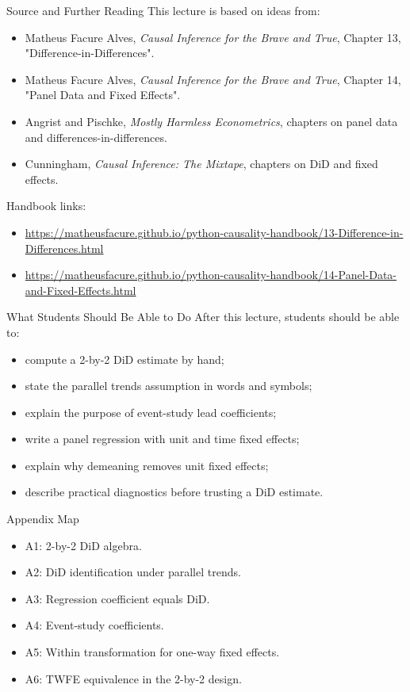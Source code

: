 \documentclass[11pt,aspectratio=169]{beamer}
\begin{document}
\begin{frame}{Source and Further Reading}
  This lecture is based on ideas from:
  \begin{itemize}
    \item Matheus Facure Alves, \emph{Causal Inference for the Brave and True}, Chapter 13, "Difference-in-Differences".
    \item Matheus Facure Alves, \emph{Causal Inference for the Brave and True}, Chapter 14, "Panel Data and Fixed Effects".
    \item Angrist and Pischke, \emph{Mostly Harmless Econometrics}, chapters on panel data and differences-in-differences.
    \item Cunningham, \emph{Causal Inference: The Mixtape}, chapters on DiD and fixed effects.
  \end{itemize}
  \vspace{0.3em}
  Handbook links:
  \begin{itemize}
    \item \url{https://matheusfacure.github.io/python-causality-handbook/13-Difference-in-Differences.html}
    \item \url{https://matheusfacure.github.io/python-causality-handbook/14-Panel-Data-and-Fixed-Effects.html}
  \end{itemize}
\end{frame}

\begin{frame}{What Students Should Be Able to Do}
  After this lecture, students should be able to:
  \begin{itemize}
    \item compute a 2-by-2 DiD estimate by hand;
    \item state the parallel trends assumption in words and symbols;
    \item explain the purpose of event-study lead coefficients;
    \item write a panel regression with unit and time fixed effects;
    \item explain why demeaning removes unit fixed effects;
    \item describe practical diagnostics before trusting a DiD estimate.
  \end{itemize}
\end{frame}

\appendix

\begin{frame}{Appendix Map}
  \begin{itemize}
    \item A1: 2-by-2 DiD algebra.
    \item A2: DiD identification under parallel trends.
    \item A3: Regression coefficient equals DiD.
    \item A4: Event-study coefficients.
    \item A5: Within transformation for one-way fixed effects.
    \item A6: TWFE equivalence in the 2-by-2 design.
  \end{itemize}
\end{frame}
\end{document}
